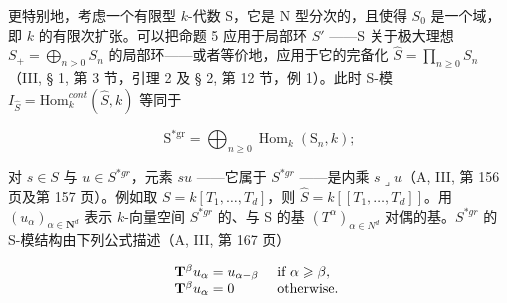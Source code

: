 更特别地，考虑一个有限型 \(k\)-代数 S，它是 N 型分次的，且使得 \(S_0\) 是一个域，即 \(k\) 的有限次扩张。可以把命题 5 应用于局部环 \(S'\) ——S 关于极大理想 \(S_+ = \bigoplus_{n > 0} S_n\) 的局部环——或者等价地，应用于它的完备化 \(\widehat{S} = \prod_{n \geqslant 0} S_n\)（III, § 1, 第 3 节，引理 2 及 § 2, 第 12 节，例 1）。此时 S-模 \(I_{\widehat{S}} = \text{Hom}_k^{cont}(\widehat{S}, k)\) 等同于

\[
\mathrm{S} ^ {* \mathrm{gr}} = \bigoplus_ {n \geqslant 0} \operatorname{Hom} _ {k} (\mathrm{S} _ {n}, k) ;
\]

对 \(s \in S\) 与 \(u \in S^{*gr}\)，元素 \(su\) ——它属于 \(S^{*gr}\) ——是内乘 \(s \lrcorner u\)（A, III, 第 156 页及第 157 页）。例如取 \(S = k[T_1, \ldots, T_d]\)，则 \(\widehat{S} = k[[T_1, \ldots, T_d]]\)。用 \((u_\alpha)_{\alpha \in \mathbf{N}^d}\) 表示 \(k\)-向量空间 \(S^{*gr}\) 的、与 S 的基 \((T^\alpha)_{\alpha \in N^d}\) 对偶的基。\(S^{*gr}\) 的 S-模结构由下列公式描述（A, III, 第 167 页）

\[
\begin{array}{l l} \mathbf {T} ^ {\beta} u _ {\alpha} = u _ {\alpha - \beta} & \text { if } \alpha \geqslant \beta , \\ \mathbf {T} ^ {\beta} u _ {\alpha} = 0 & \text { otherwise. } \end{array}
\]
\relax{}
